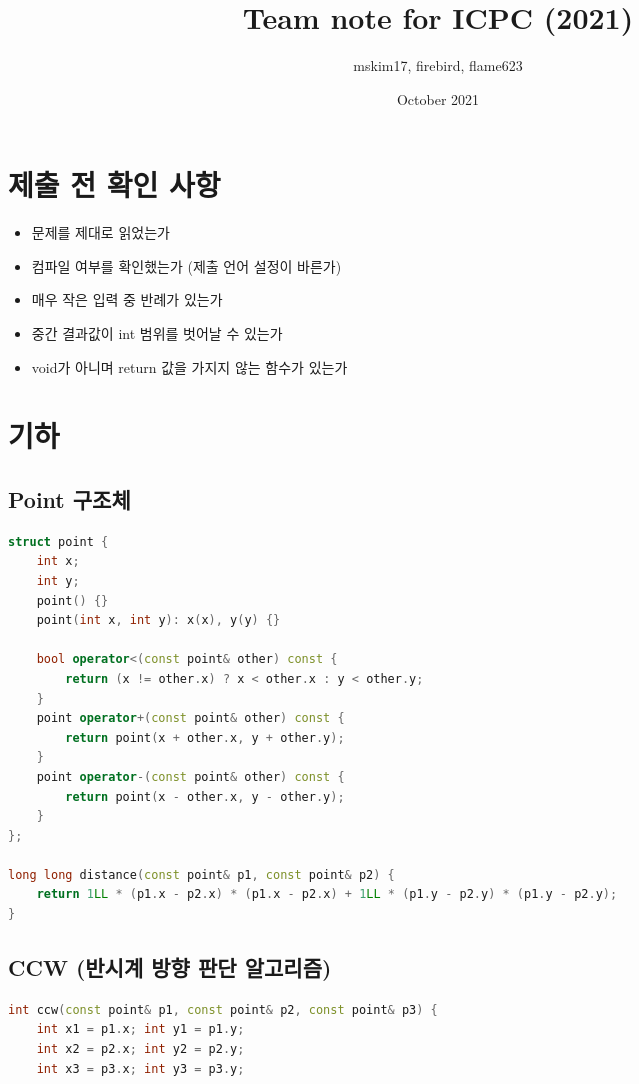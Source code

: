\documentclass[]{article}
\title{Team note for ICPC (2021)}
\author{mskim17, firebird, flame623}
\date{October 2021}
\begin{document}
\maketitle
\begin{multicols}{2}
\tableofcontents
\end{multicols}
\clearpage

\begin{multicols*}{2}
\section{제출 전 확인 사항}
\begin{itemize}
    \item 문제를 제대로 읽었는가
    \item 컴파일 여부를 확인했는가 (제출 언어 설정이 바른가)
    \item 매우 작은 입력 중 반례가 있는가
    \item 중간 결과값이 int 범위를 벗어날 수 있는가
    \item void가 아니며 return 값을 가지지 않는 함수가 있는가
\end{itemize}
\vskip 40mm
\section{기하}
\subsection{Point 구조체}
\begin{lstlisting}[language=c++]
struct point {
    int x;
    int y;
    point() {}
    point(int x, int y): x(x), y(y) {}

    bool operator<(const point& other) const {
        return (x != other.x) ? x < other.x : y < other.y;
    }
    point operator+(const point& other) const {
        return point(x + other.x, y + other.y);
    }
    point operator-(const point& other) const {
        return point(x - other.x, y - other.y);
    }
};

long long distance(const point& p1, const point& p2) {
    return 1LL * (p1.x - p2.x) * (p1.x - p2.x) + 1LL * (p1.y - p2.y) * (p1.y - p2.y);
}
\end{lstlisting}
\columnbreak
\subsection{CCW (반시계 방향 판단 알고리즘)}
\begin{lstlisting}[language=c++]
int ccw(const point& p1, const point& p2, const point& p3) {
    int x1 = p1.x; int y1 = p1.y;
    int x2 = p2.x; int y2 = p2.y;
    int x3 = p3.x; int y3 = p3.y;


\end{lstlisting}
\end{multicols*}
\end{document}
